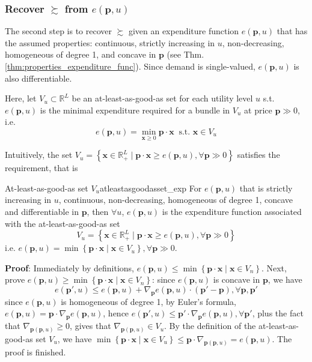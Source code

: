 \subsubsection*{Recover $\succsim$ from $e(\mathbf{p},u)$}
The second step is to recover $\succsim$ given an expenditure function $e(\mathbf{p},u)$ that has the assumed properties: continuous, strictly increasing in $u$, non-decreasing, homogeneous of degree 1, and concave in $\mathbf{p}$ (see Thm.\ref{thm:properties_expenditure_func}).
Since demand is single-valued, $e(\mathbf{p},u)$ is also differentiable.

Here, let $V_u\subset \mathbb{R}^L$  be an at-least-as-good-as set for each utility level $u$ s.t. $e(\mathbf{p},u)$ is the minimal expenditure required for a bundle in $V_u$ at price $\mathbf{p}\gg  0$, i.e. 
$$
e(\mathbf{p},u)=\min_{\mathbf{x}\geq 0}\mathbf{p}\cdot \mathbf{x}\ \text{ s.t. }\mathbf{x}\in V_u
$$

Intuitively, the set $V_u = \left\{ \mathbf{x} \in\mathbb{R}^L_+\mid \mathbf{p}\cdot \mathbf{x}\geq e(\mathbf{p},u),\forall \mathbf{p}\gg 0 \right\}$ satisfies the requirement, that is 
\begin{proposition}{At-least-as-good-as set $V_u$}{atleastasgoodasset_exp}
    For $e(\mathbf{p},u)$ that is strictly increasing in $u$, continuous, non-decreasing, homogeneous of degree 1, concave and differentiable in $\mathbf{p}$, then $\forall u$, $e(\mathbf{p},u)$ is the expenditure function associated with the at-least-as-good-as set
    $$
    V_u = \left\{ \mathbf{x}\in\mathbb{R}^L_+\mid \mathbf{p}\cdot\mathbf{x}\geq e(\mathbf{p},u),\forall \mathbf{p}\gg 0 \right\}
    $$
    i.e. $e(\mathbf{p},u)=\min\left\{ \mathbf{p}\cdot \mathbf{x}\mid \mathbf{x}\in V_u \right\},\forall \mathbf{p}\gg 0$.
\end{proposition}

\textbf{Proof}: Immediately by definitions, $e(\mathbf{p},u)\leq \min\left\{\mathbf{p}\cdot\mathbf{x}\mid \mathbf{x}\in V_n\right\}$. Next, prove $e(\mathbf{p},u)\geq \min\left\{\mathbf{p}\cdot\mathbf{x}\mid \mathbf{x}\in V_n\right\}$: since $e(\mathbf{p},u)$ is concave in $\mathbf{p}$, we have
$$
e(\mathbf{p}',u)\leq e(\mathbf{p},u)+\nabla_{\mathbf{p}}e(\mathbf{p},u)\cdot(\mathbf{p}'-\mathbf{p}),\forall \mathbf{p},\mathbf{p}'
$$
since $e(\mathbf{p},u)$ is homogeneous of degree 1, by Euler's formula, $e(\mathbf{p},u)=\mathbf{p}\cdot\nabla_{\mathbf{p}}e(\mathbf{p},u)$, hence $e(\mathbf{p}',u)\leq \mathbf{p}'\cdot \nabla_{\mathbf{p}}e(\mathbf{p},u),\forall \mathbf{p}'$, plus the fact that $\nabla_{\mathbf{p}(\mathbf{p},u)}\geq 0$, gives that $\nabla_{\mathbf{p}(\mathbf{p},u)}\in V_u$.
By the definition of the at-least-as-good-as set $V_u$, we have $\min\left\{\mathbf{p}\cdot\mathbf{x}\mid \mathbf{x}\in V_u\right\}\leq \mathbf{p}\cdot \nabla_{\mathbf{p}(\mathbf{p},u)}=e(\mathbf{p},u)$. The proof is finished.

